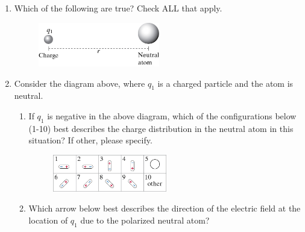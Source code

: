 \documentclass{article}
\begin{document}
\begin{enumerate}
\item Which of the following are true? Check ALL that apply.

\begin{figure}[ht!]
	\centering
	\includegraphics[width=0.5\textwidth]{..//lectures/figures/Ch14jpegs/fig1479.jpg}
\end{figure}

\item Consider the diagram above, where $q_1$ is a charged particle and the atom is neutral.

\begin{enumerate}
	\item If $q_1$ is negative in the above diagram, which of the configurations below (1-10) best describes the charge distribution in the neutral atom in this situation? If other, please specify.


\begin{figure}[ht!]
	\centering
	\includegraphics[width=0.5\textwidth]{..//lectures/figures/Ch14jpegs/fig1480.jpg}
\end{figure}

\item Which arrow below best describes the direction of the electric field at the location of $q_1$ due to the polarized neutral atom?


\end{enumerate}
\end{enumerate}
\end{document}
